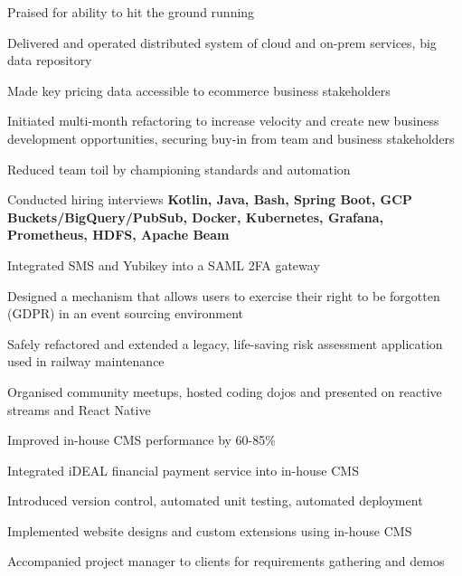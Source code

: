 \documentclass[a4paper,10pt]{article}
\begin{document}
            \begin{resume_list}
              \item Praised for ability to hit the ground running
              \item Delivered and operated distributed system of cloud and on-prem services, big data repository
              \item Made key pricing data accessible to ecommerce business stakeholders
              \item Initiated multi-month refactoring to increase velocity and create new business development opportunities, securing buy-in from team and business stakeholders
              \item Reduced team toil by championing standards and automation
              \item Conducted hiring interviews
              \newline \textbf{Kotlin, Java, Bash, Spring Boot, GCP Buckets/BigQuery/PubSub, Docker, Kubernetes, Grafana, Prometheus, HDFS, Apache Beam}
            \end{resume_list}


            \begin{resume_list}
              \item Integrated SMS and Yubikey into a SAML 2FA gateway
              \item Designed a mechanism that allows users to exercise their right to be forgotten (GDPR) in an event sourcing environment
              \item Safely refactored and extended a legacy, life-saving risk assessment application used in railway maintenance
              \item Organised community meetups, hosted coding dojos and presented on reactive streams and React Native
            \end{resume_list}


            \begin{resume_list}
              \item Improved in-house CMS performance by 60-85\%
              \item Integrated iDEAL financial payment service into in-house CMS
              \item Introduced version control, automated unit testing, automated deployment
              \item Implemented website designs and custom extensions using in-house CMS
              \item Accompanied project manager to clients for requirements gathering and demos
            \end{resume_list}
\end{document}
